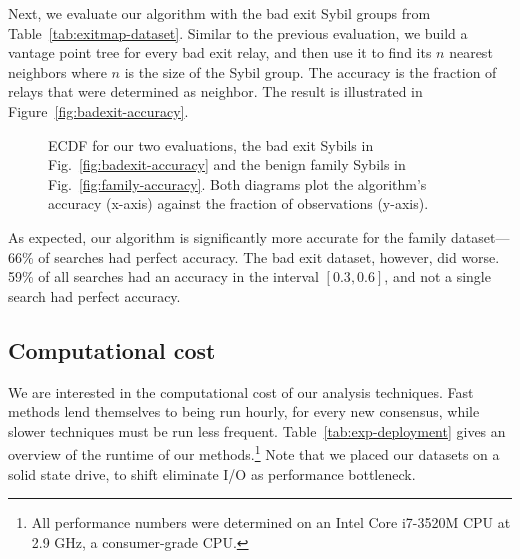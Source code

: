 Next, we evaluate our algorithm with the bad exit Sybil groups from
Table~\ref{tab:exitmap-dataset}.  Similar to the previous evaluation, we build a
vantage point tree for every bad exit relay, and then use it to find its $n$
nearest neighbors where $n$ is the size of the Sybil group.  The accuracy is the
fraction of relays that were determined as neighbor.  The result is illustrated
in Figure~\ref{fig:badexit-accuracy}.

\begin{figure}
\centering
{}
\caption{ECDF for our two evaluations, the bad exit Sybils
	in Fig.~\ref{fig:badexit-accuracy} and the benign family Sybils
	in Fig.~\ref{fig:family-accuracy}.  Both diagrams plot the algorithm's
accuracy (x-axis) against the fraction of observations (y-axis).}
\label{fig:accuracy}
\end{figure}

As expected, our algorithm is significantly more accurate for the family
dataset---66\% of searches had perfect accuracy.  The bad exit dataset, however,
did worse.  59\% of all searches had an accuracy in the interval $[0.3,0.6]$,
and not a single search had perfect accuracy.

\subsection{Computational cost}
\label{sec:performance}
We are interested in the computational cost of our analysis techniques.  Fast
methods lend themselves to being run hourly, for every new consensus, while
slower techniques must be run less frequent.  Table~\ref{tab:exp-deployment}
gives an overview of the runtime of our methods.\footnote{All performance
numbers were determined on an Intel Core i7-3520M CPU at 2.9 GHz, a
consumer-grade CPU.}  Note that we
placed our datasets on a solid state drive, to shift eliminate I/O as
performance bottleneck.

